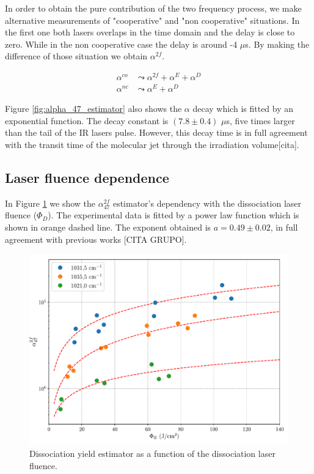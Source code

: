 \documentclass[global,twocolumn]{svjour}
\begin{document}
In order to obtain the pure contribution of the two frequency process, we make alternative measurements of "cooperative" and "non cooperative" situations. In the first one both lasers overlaps in the time domain and the delay is close to zero. While in the non cooperative case the delay is around -4 $\mu$s. By making the difference of those situation we obtain $\alpha^{2f}$.

\begin{equation}
\begin{split}
\alpha^{co} &\leadsto \alpha^{2f} + \alpha^{E} + \alpha^{D} \\
\alpha^{nc} &\leadsto \alpha^{E} + \alpha^{D}
\end{split}
\label{alfa_47_co}
\end{equation}

Figure \ref{fig:alpha_47_estimator} also shows the $\alpha$ decay which is fitted by an exponential function. The decay constant is $(7.8\pm0.4)$ $\mu$s, five times larger than the tail of the IR lasers pulse. However, this decay time is in full agreement with the transit time of the molecular jet through the irradiation volume[cita].

\subsection{Laser fluence dependence}
In Figure \ref{fig:alpha_phi_excitation} we show the $\alpha^{2f}_{47}$ estimator's dependency with the dissociation laser fluence ($\Phi_{D}$). The experimental data is fitted by a power law function which is shown in orange dashed line. The exponent obtained is $a = 0.49\pm 0.02$, in full agreement with previous works [CITA GRUPO].

\begin{figure}[h]
	\centering
	\includegraphics[width = 1\linewidth]{figures/alpha_47_phi_bombeo.pdf}
	\caption{ Dissociation yield estimator as a function of the dissociation laser fluence.}
	\label{fig:alpha_phi_excitation}
\end{figure}
\end{document}
